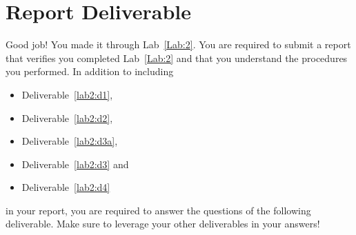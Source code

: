 \section{Report Deliverable}
Good job! You made it through Lab~\ref{Lab:2}.
You are required to submit a report
that verifies you completed Lab~\ref{Lab:2} and that you understand the
procedures you performed. In addition to including
\begin{itemize}
  \item{Deliverable~\ref{lab2:d1},}
  \item{Deliverable~\ref{lab2:d2},}
  \item{Deliverable~\ref{lab2:d3a},}
  \item{Deliverable~\ref{lab2:d3} and }
  \item{Deliverable~\ref{lab2:d4}}
\end{itemize}
in your report,
you are required to answer the questions of the following deliverable.
Make sure to leverage your other deliverables in your answers!
